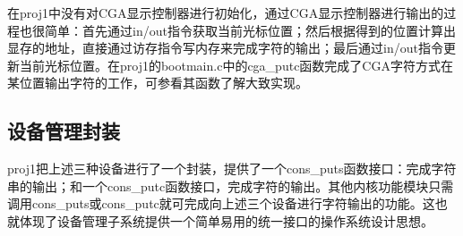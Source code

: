 在proj1中没有对CGA显示控制器进行初始化，通过CGA显示控制器进行输出的过程也很简单：首先通过in/out指令获取当前光标位置；然后根据得到的位置计算出显存的地址，直接通过访存指令写内存来完成字符的输出；最后通过in/out指令更新当前光标位置。在proj1的bootmain.c中的cga\_putc函数完成了CGA字符方式在某位置输出字符的工作，可参看其函数了解大致实现。

\subsection{设备管理封装}\label{ux8bbeux5907ux7ba1ux7406ux5c01ux88c5}

proj1把上述三种设备进行了一个封装，提供了一个cons\_puts函数接口：完成字符串的输出；和一个cons\_putc函数接口，完成字符的输出。其他内核功能模块只需调用cons\_puts或cons\_putc就可完成向上述三个设备进行字符输出的功能。这也就体现了设备管理子系统提供一个简单易用的统一接口的操作系统设计思想。
